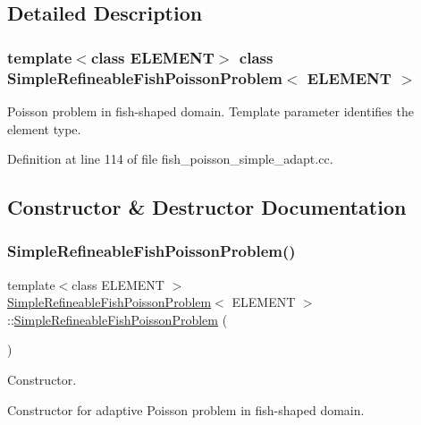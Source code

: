 \subsection{Detailed Description}
\subsubsection*{template$<$class E\+L\+E\+M\+E\+NT$>$\newline
class Simple\+Refineable\+Fish\+Poisson\+Problem$<$ E\+L\+E\+M\+E\+N\+T $>$}

Poisson problem in fish-\/shaped domain. Template parameter identifies the element type. 

Definition at line 114 of file fish\+\_\+poisson\+\_\+simple\+\_\+adapt.\+cc.



\subsection{Constructor \& Destructor Documentation}
\mbox{\label{classSimpleRefineableFishPoissonProblem_a8ae306f40e7e2e0cf20c5377e190716d}} 
\subsubsection{\texorpdfstring{Simple\+Refineable\+Fish\+Poisson\+Problem()}{SimpleRefineableFishPoissonProblem()}}
{\footnotesize\ttfamily template$<$class E\+L\+E\+M\+E\+NT $>$ \\
\hyperlink{classSimpleRefineableFishPoissonProblem}{Simple\+Refineable\+Fish\+Poisson\+Problem}$<$ E\+L\+E\+M\+E\+NT $>$\+::\hyperlink{classSimpleRefineableFishPoissonProblem}{Simple\+Refineable\+Fish\+Poisson\+Problem} (\begin{DoxyParamCaption}{ }\end{DoxyParamCaption})}



Constructor. 

Constructor for adaptive Poisson problem in fish-\/shaped domain. 

